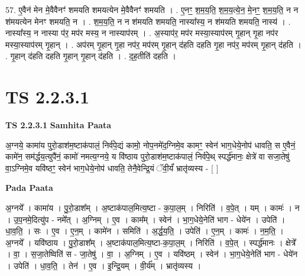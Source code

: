 \documentclass[17pt]{extarticle}
\begin{document}
57. ए॒वैन॑ मेन मे॒वैवैनꣳ॑ शमयति शमयत्येन मे॒वैवैनꣳ॑ शमयति । . ए॒नꣳ॒॒ श॒म॒य॒ति॒ श॒म॒य॒त्ये॒न॒ मे॒नꣳ॒॒ श॒म॒य॒ति॒ न न श॑मयत्येन मेनꣳ शमयति॒ न । . श॒म॒य॒ति॒ न न श॑मयति शमयति॒ नास्या᳚स्य॒ न श॑मयति शमयति॒ नास्य॑ । . नास्या᳚स्य॒ न नास्या प॑र॒ मप॑र मस्य॒ न नास्याप॑रम् । . अ॒स्याप॑र॒ मप॑र मस्या॒स्याप॑रम् गृ॒हान् गृ॒हा नप॑र मस्या॒स्याप॑रम् गृ॒हान् । . अप॑रम् गृ॒हान् गृ॒हा नप॑र॒ मप॑रम् गृ॒हान् द॑हति दहति गृ॒हा नप॑र॒ मप॑रम् गृ॒हान् द॑हति । . गृ॒हान् द॑हति दहति गृ॒हान् गृ॒हान् द॑हति । . द॒ह॒तीति॑ दहति । \newline
\pagebreak
{}

\section{ TS 2.2.3.1 }

\textbf{TS 2.2.3.1 } \newline
\textbf{Samhita Paata} \newline

अ॒ग्नये॒ कामा॑य पुरो॒डाश॑म॒ष्टाक॑पालं॒ निर्व॑पे॒द्यं कामो॒ नोप॒नमे॑द॒ग्निमे॒व कामꣳ॒॒ स्वेन॑ भाग॒धेये॒नोप॑ धावति॒ स ए॒वैनं॒ कामे॑न॒ सम॑र्द्धय॒त्युपै॑नं॒ कामो॑ नमत्य॒ग्नये॒ य वि॑ष्ठाय पुरो॒डाश॑म॒ष्टाक॑पालं॒ निर्व॑पे॒थ् स्पर्द्ध॑मानः॒ क्षेत्रे॑ वा सजा॒तेषु॑ वा॒ऽग्निमे॒व यवि॑ष्ठꣳ॒॒ स्वेन॑ भाग॒धेये॒नोप॑ धावति॒ तेनै॒वेन्द्रि॒यं ॅवी॒र्यं॑ भ्रातृ॑व्यस्य - [  ] \newline

\textbf{Pada Paata} \newline

अ॒ग्नये᳚ । कामा॑य । पु॒रो॒डाश᳚म् । अ॒ष्टाक॑पाल॒मित्य॒ष्टा - क॒पा॒ल॒म् । निरिति॑ । व॒पे॒त् । यम् । कामः॑ । न । उ॒प॒नमे॒दित्यु॑प - नमे᳚त् । अ॒ग्निम् । ए॒व । काम᳚म् । स्वेन॑ । भा॒ग॒धेये॒नेति॑ भाग - धेये॑न । उपेति॑ । धा॒व॒ति॒ । सः । ए॒व । ए॒न॒म् । कामे॑न । समिति॑ । अ॒र्द्ध॒य॒ति॒ । उपेति॑ । ए॒न॒म् । कामः॑ । न॒म॒ति॒ । अ॒ग्नये᳚ । यवि॑ष्ठाय । पु॒रो॒डाश᳚म् । अ॒ष्टाक॑पाल॒मित्य॒ष्टा-क॒पा॒ल॒म् । निरिति॑ । व॒पे॒त् । स्पर्द्ध॑मानः । क्षेत्रे᳚ । वा॒ । स॒जा॒तेष्विति॑ स - जा॒तेषु॑ । वा॒ । अ॒ग्निम् । ए॒व । यवि॑ष्ठम् । स्वेन॑ । भा॒ग॒धेये॒नेति॑ भाग - धेये॑न । उपेति॑ । धा॒व॒ति॒ । तेन॑ । ए॒व । इ॒न्द्रि॒यम् । वी॒र्य᳚म् । भ्रातृ॑व्यस्य ।  \newline
\end{document}
